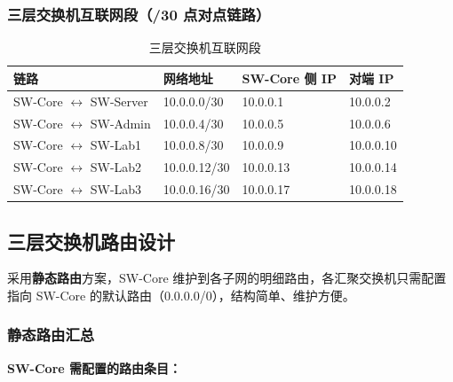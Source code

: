\documentclass[12pt,a4paper]{ctexart}
\begin{document}
\subsubsection*{三层交换机互联网段（/30 点对点链路）}

\begin{table}[H]
\centering
\caption{三层交换机互联网段}
\label{tab:interlink}
\begin{tabular}{llll}
\toprule
\textbf{链路} & \textbf{网络地址} & \textbf{SW-Core 侧 IP} & \textbf{对端 IP} \\
\midrule
SW-Core $\leftrightarrow$ SW-Server & 10.0.0.0/30  & 10.0.0.1  & 10.0.0.2  \\
SW-Core $\leftrightarrow$ SW-Admin  & 10.0.0.4/30  & 10.0.0.5  & 10.0.0.6  \\
SW-Core $\leftrightarrow$ SW-Lab1   & 10.0.0.8/30  & 10.0.0.9  & 10.0.0.10 \\
SW-Core $\leftrightarrow$ SW-Lab2   & 10.0.0.12/30 & 10.0.0.13 & 10.0.0.14 \\
SW-Core $\leftrightarrow$ SW-Lab3   & 10.0.0.16/30 & 10.0.0.17 & 10.0.0.18 \\
\bottomrule
\end{tabular}
\end{table}

\subsection{三层交换机路由设计}

采用\textbf{静态路由}方案，SW-Core 维护到各子网的明细路由，各汇聚交换机只需配置指向 SW-Core 的默认路由（0.0.0.0/0），结构简单、维护方便。

\subsubsection{静态路由汇总}

\textbf{SW-Core 需配置的路由条目：}
\end{document}
